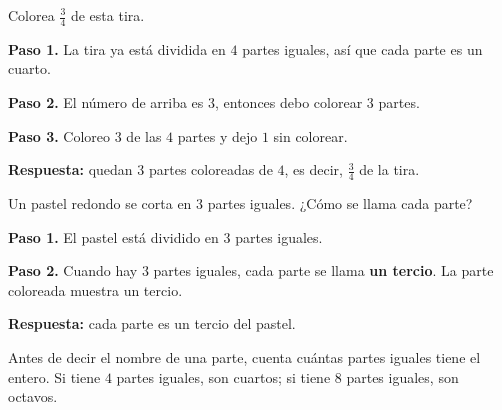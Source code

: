 \begin{wbexample}
Colorea $\frac{3}{4}$ de esta tira.

\begin{center}
\end{center}

\textbf{Paso 1.} La tira ya está dividida en $4$ partes iguales, así que cada parte es un cuarto.

\textbf{Paso 2.} El número de arriba es $3$, entonces debo colorear $3$ partes.

\textbf{Paso 3.} Coloreo $3$ de las $4$ partes y dejo $1$ sin colorear.

\begin{center}
\end{center}

\textbf{Respuesta:} quedan $3$ partes coloreadas de $4$, es decir, $\frac{3}{4}$ de la tira.
\end{wbexample}

\begin{wbexample}
Un pastel redondo se corta en $3$ partes iguales. ¿Cómo se llama cada parte?

\textbf{Paso 1.} El pastel está dividido en $3$ partes iguales.

\textbf{Paso 2.} Cuando hay $3$ partes iguales, cada parte se llama \textbf{un tercio}. La parte coloreada muestra un tercio.

\begin{center}
\end{center}

\textbf{Respuesta:} cada parte es un tercio del pastel.
\end{wbexample}

\begin{wbtip}
Antes de decir el nombre de una parte, cuenta cuántas partes iguales tiene el entero. Si tiene $4$ partes iguales, son cuartos; si tiene $8$ partes iguales, son octavos.
\end{wbtip}


